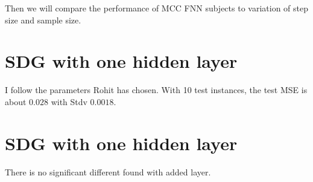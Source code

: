 \documentclass[11pt, oneside, reqno]{amsart}
\numberwithin{equation}{section}
\theoremstyle{plain}%
\theoremstyle{definition}
\theoremstyle{remark}
\begin{document}
Then we will compare the performance of MCC FNN subjects to variation of step size and sample size.

\section{SDG with one hidden layer}
I follow the parameters Rohit has chosen. With 10 test instances, the test MSE is about $0.028$ with Stdv $0.0018$.

\section{SDG with one hidden layer}
There is no significant different found with added layer.

\begin{comment}
\begin{table}[ht]
\begin{center}
\begin{tabular}{ |c|c|c|} 
\hline
 & train & test  \\ 
 \hline\hline
MSE & 0.0011 & 0.0012  \\ 
Epochs & 1700 & 1800  \\ 
 Time & 19 & 20\\
 \hline
\end{tabular}
\end{center}
\end{table}

\begin{table}[ht]
\begin{center}
\begin{tabular}{ |c|c|c|} 
\hline
 & mean & sdtc  \\ 
 \hline\hline
trainPerf & 93.125 & 12.327  \\ 
testPerf & 98.75 & 2.5  \\ 
 Time & 1.95 & 0.53\\
 \hline
\end{tabular}
\end{center}
\end{table}  
\end{comment}
\end{document}
